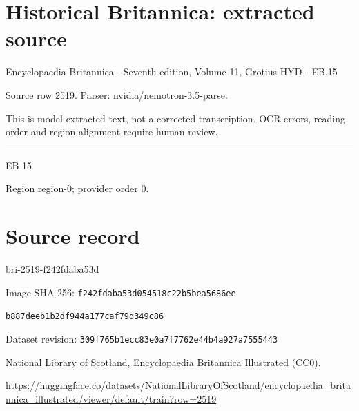 \documentclass[11pt]{article}
\begin{document}
\section*{Historical Britannica: extracted source}
Encyclopaedia Britannica - Seventh edition, Volume 11, Grotius-HYD - EB.15\par
{\small Source row 2519. Parser: nvidia/nemotron-3.5-parse.\par}
{\small This is model-extracted text, not a corrected transcription. OCR errors, reading order and region alignment require human review.\par}
\hrule\medskip
EB 15
\par

{\scriptsize\color{gray} Region region-0; provider order 0.\par}
\medskip
\newpage\section*{Source record}
bri-2519-f242fdaba53d\par
Image SHA-256: \texttt{f242fdaba53d054518c22b5bea5686ee}\par\texttt{b887deeb1b2df944a177caf79d349c86}\par
Dataset revision: \texttt{309f765b1ecc83e0a7f7}\texttt{762e44b4a927a7555443}\par
National Library of Scotland, Encyclopaedia Britannica Illustrated (CC0).\par
\url{https://huggingface.co/datasets/NationalLibraryOfScotland/encyclopaedia_britannica_illustrated/viewer/default/train?row=2519}
\end{document}
